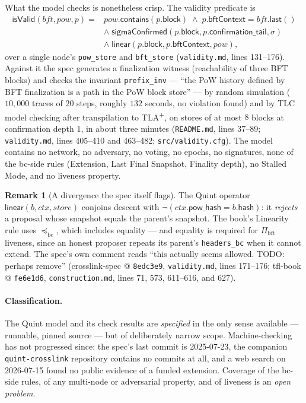 \documentclass[11pt,a4paper]{article}
\theoremstyle{definition}
\newtheorem{remark}[theorem]{Remark}
\begin{document}
What the model checks is nonetheless crisp. The validity predicate is
\[
\begin{aligned}
\mathsf{isValid}(\mathit{bft},\mathit{pow},p) = {}&
  \mathit{pow}.\mathsf{contains}(p.\mathsf{block})
  \;\wedge\; p.\mathsf{bftContext} = \mathit{bft}.\mathsf{last}()\\
&\wedge\; \mathsf{sigmaConfirmed}(p.\mathsf{block},
    p.\mathsf{confirmation\_tail}, \sigma)\\
&\wedge\; \mathsf{linear}(p.\mathsf{block}, p.\mathsf{bftContext},
    \mathit{pow}),
\end{aligned}
\]
over a single node's \texttt{pow\_store} and \texttt{bft\_store}
(\texttt{validity.md}, lines 131--176). Against it the spec generates a
finalization witness (reachability of three BFT blocks) and checks the
invariant \texttt{prefix\_inv} --- ``the PoW history defined by BFT
finalization is a path in the PoW block store'' --- by random simulation
($10{,}000$ traces of $20$ steps, roughly $132$ seconds, no violation
found) and by TLC model checking after transpilation to TLA\textsuperscript{+},
on stores of at most $8$ blocks at confirmation depth $1$, in about three
minutes (\texttt{README.md}, lines 37--89; \texttt{validity.md}, lines
405--410 and 463--482; \texttt{src/validity.cfg}). The model contains no
network, no adversary, no voting, no epochs, no signatures, none of the
bc-side rules (Extension, Last Final Snapshot, Finality depth), no Stalled
Mode, and no liveness property.

\begin{remark}[A divergence the spec itself flags]\label{rem:xl-quint-div}
The Quint operator $\mathsf{linear}(b, \mathit{ctx}, \mathit{store})$
conjoins descent with
$\neg(\mathit{ctx}.\mathsf{pow\_hash} = b.\mathsf{hash})$: it
\emph{rejects} a proposal whose snapshot equals the parent's snapshot. The
book's Linearity rule uses $\preceq_{\mathrm{bc}}$, which includes
equality --- and equality is required for $\Pi_{\mathrm{bft}}$ liveness,
since an honest proposer repeats its parent's \texttt{headers\_bc} when it
cannot extend. The spec's own comment reads ``this actually seems allowed.
TODO: perhaps remove'' (crosslink-spec @ \texttt{8edc3e9},
\texttt{validity.md}, lines 171--176; tfl-book @ \texttt{fe6e1d6},
\texttt{construction.md}, lines 71, 573, 611--616, and 627).
\end{remark}

\paragraph{Classification.} The Quint model and its check results are
\emph{specified} in the only sense available --- runnable, pinned source
--- but of deliberately narrow scope. Machine-checking has not progressed
since: the spec's last commit is 2025-07-23, the companion
\texttt{quint-crosslink} repository contains no commits at all, and a web
search on 2026-07-15 found no public evidence of a funded extension.
Coverage of the bc-side rules, of any multi-node or adversarial property,
and of liveness is an \emph{open problem}.
\end{document}
